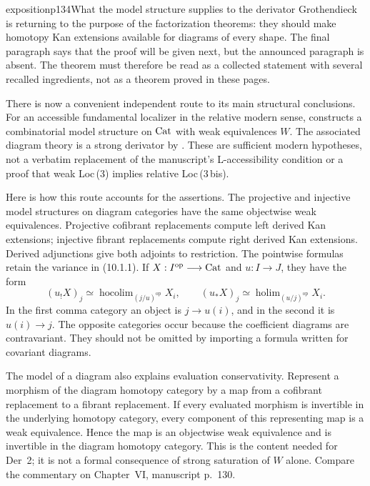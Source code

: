 \begin{dcomment}{exposition}{p134}{What the model structure supplies to the derivator}
Grothendieck is returning to the purpose of the factorization theorems: they should make homotopy Kan extensions available for diagrams of every shape. The final paragraph says that the proof will be given next, but the announced paragraph is absent. The theorem must therefore be read as a collected statement with several recalled ingredients, not as a theorem proved in these pages.

There is now a convenient independent route to its main structural conclusions. For an accessible fundamental localizer in the relative modern sense, \citet[Theorem 5.2.15]{Cisinski2006} constructs a combinatorial model structure on $\mathrm{Cat}$ with weak equivalences $W$. The associated diagram theory is a strong derivator by \citet[Proposition 1.30]{Groth2013}. These are sufficient modern hypotheses, not a verbatim replacement of the manuscript's L-accessibility condition or a proof that weak Loc\,(3) implies relative Loc\,(3\,bis).

Here is how this route accounts for the assertions. The projective and injective model structures on diagram categories have the same objectwise weak equivalences. Projective cofibrant replacements compute left derived Kan extensions; injective fibrant replacements compute right derived Kan extensions. Derived adjunctions give both adjoints to restriction. The pointwise formulas retain the variance in (10.1.1). If $X:I^{\mathrm{op}}\longrightarrow\mathrm{Cat}$ and $u:I\longrightarrow J$, they have the form
\[
 (u_!X)_j\simeq
 \operatorname{hocolim}_{(j/u)^{\mathrm{op}}}X_i,
 \qquad
 (u_*X)_j\simeq
 \operatorname{holim}_{(u/j)^{\mathrm{op}}}X_i.
\]
In the first comma category an object is $j\longrightarrow u(i)$, and in the second it is $u(i)\longrightarrow j$. The opposite categories occur because the coefficient diagrams are contravariant. They should not be omitted by importing a formula written for covariant diagrams.

The model of a diagram also explains evaluation conservativity. Represent a morphism of the diagram homotopy category by a map from a cofibrant replacement to a fibrant replacement. If every evaluated morphism is invertible in the underlying homotopy category, every component of this representing map is a weak equivalence. Hence the map is an objectwise weak equivalence and is invertible in the diagram homotopy category. This is the content needed for Der~2; it is not a formal consequence of strong saturation of $W$ alone. Compare the commentary on Chapter~VI, manuscript p.~130.


\end{dcomment}
